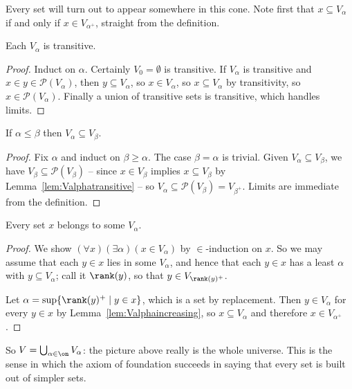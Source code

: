 Every set will turn out to appear somewhere in this cone. Note first that $x \subseteq V_\alpha$ if and only if $x \in V_{\alpha^+}$, straight from the definition.

\begin{lemma}\label{lem:Valphatransitive}
  Each $V_\alpha$ is transitive.
\end{lemma}
\begin{proof}
  Induct on $\alpha$. Certainly $V_0 = \emptyset$ is transitive. If $V_\alpha$ is transitive and $x \in y \in \mathcal{P}(V_\alpha)$, then $y \subseteq V_\alpha$, so $x \in V_\alpha$, so $x \subseteq V_\alpha$ by transitivity, so $x \in \mathcal{P}(V_\alpha)$. Finally a union of transitive sets is transitive, which handles limits.
\end{proof}

\begin{lemma}\label{lem:Valphaincreasing}
  If $\alpha \leq \beta$ then $V_\alpha \subseteq V_\beta$.
\end{lemma}
\begin{proof}
  Fix $\alpha$ and induct on $\beta \geq \alpha$. The case $\beta = \alpha$ is trivial. Given $V_\alpha \subseteq V_\beta$, we have $V_\beta \subseteq \mathcal{P}(V_\beta)$ -- since $x \in V_\beta$ implies $x \subseteq V_\beta$ by Lemma~\ref{lem:Valphatransitive} -- so $V_\alpha \subseteq \mathcal{P}(V_\beta) = V_{\beta^+}$. Limits are immediate from the definition.
\end{proof}

\begin{theorem}\label{thm:everysetinV}
  Every set $x$ belongs to some $V_\alpha$.
\end{theorem}
\begin{proof}
  We show $(\forall x)(\exists \alpha)(x \in V_\alpha)$ by $\in$-induction on $x$. So we may assume that each $y \in x$ lies in some $V_\alpha$, and hence that each $y \in x$ has a least $\alpha$ with $y \subseteq V_\alpha$; call it $\rank(y)$, so that $y \in V_{\rank(y)^+}$.

  Let $\alpha = \sup\{\rank(y)^+ \mid y \in x\}$, which is a set by replacement. Then $y \in V_\alpha$ for every $y \in x$ by Lemma~\ref{lem:Valphaincreasing}, so $x \subseteq V_\alpha$ and therefore $x \in V_{\alpha^+}$.
\end{proof}

So $V = \bigcup_{\alpha \in \on} V_\alpha$: the picture above really is the whole universe. This is the sense in which the axiom of foundation succeeds in saying that every set is built out of simpler sets.

